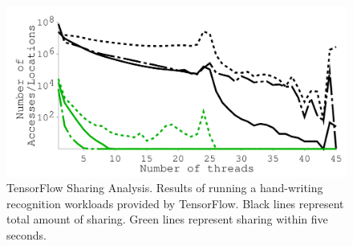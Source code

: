 {
\begin{figure}[t]
\begin{center}
\centerline{\includegraphics[width=\textwidth]{hotpot/Figures/g_plot_tensorflow_average.pdf}}
\caption[TensorFlow Sharing Analysis.]
{
TensorFlow Sharing Analysis.
Results of running a hand-writing recognition workloads provided by TensorFlow.
Black lines represent total amount of sharing.
Green lines represent sharing within five seconds.
}
\label{fig-tensorflow}
\end{center}
\end{figure}
}